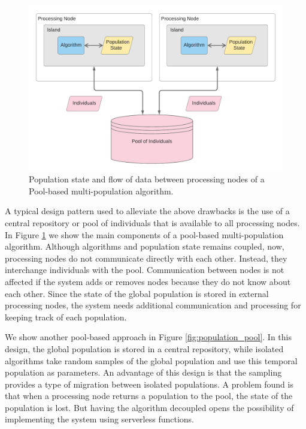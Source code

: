 \documentclass[review]{elsarticle}
\begin{document}
\begin{figure}[ht]
    \centering
    \includegraphics[width=\textwidth]{pool_island}
    \caption{Population state and flow of data between processing nodes of a Pool-based multi-population algorithm.}
    \label{fig:pool_island}
\end{figure}

A typical design pattern used to alleviate the above drawbacks is the use of a
central repository or pool of individuals that is available to all processing
nodes.  In Figure \ref{fig:pool_island} we show the main components of a pool-based
multi-population algorithm. Although algorithms and population state remains
coupled, now, processing nodes do not communicate directly with each other.
Instead, they interchange individuals with the pool. Communication between nodes
is not affected if the system adds or removes nodes because they do not know
about each other.  Since the state of the global population is stored in
external processing nodes, the system needs additional communication and
processing for keeping track of each population.

We show another pool-based approach in Figure  \ref{fig:population_pool}. In
this design, the global population is stored in a central repository, while
isolated algorithms take random samples of the global population and use this
temporal population as parameters. An advantage of this design is that the
sampling provides a type of migration between isolated populations. A problem
found is that when a processing node returns a population to the pool, the
state of the population is lost. But having the algorithm decoupled opens the
possibility of implementing the system using serverless functions.
\end{document}
